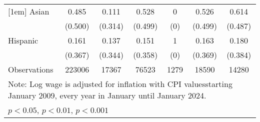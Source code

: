 \begin{table}[htbp]
\begin{tabular}{l*{6}{c}}
[1em]
Asian               &       0.485         &       0.111         &       0.528         &           0         &       0.526         &       0.614         \\
                    &     (0.500)         &     (0.314)         &     (0.499)         &         (0)         &     (0.499)         &     (0.487)         \\
[1em]
Hispanic            &       0.161         &       0.137         &       0.151         &           1         &       0.163         &       0.180         \\
                    &     (0.367)         &     (0.344)         &     (0.358)         &         (0)         &     (0.369)         &     (0.384)         \\
\hline
Observations        &      223006         &       17367         &       76523         &        1279         &       18590         &       14280         \\
\hline\hline
\multicolumn{7}{l}{\footnotesize Note: Log wage is adjusted for inflation with CPI valuesstarting January 2009, every year in January until January 2024.}\\
\multicolumn{7}{l}{\footnotesize \sym{*} \(p<0.05\), \sym{**} \(p<0.01\), \sym{***} \(p<0.001\)}\\
\end{tabular}
\end{table}
